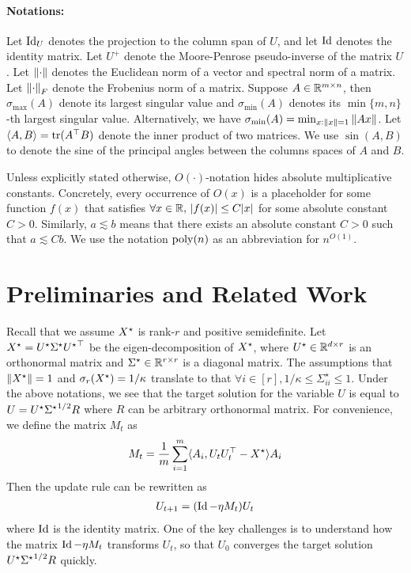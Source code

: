 \paragraph{Notations:}
Let $\operatorname{Id}_U$ denotes the projection to the column span of $U$, and let $\operatorname{Id}$ denotes the identity matrix.  Let $U^+$ denote the Moore-Penrose pseudo-inverse of the matrix $U$. Let $\left\|\cdot\right\|$ denotes the Euclidean norm of a vector and spectral norm of a matrix.  Let $\left\|\cdot\right\|_F$ denote the Frobenius norm of a matrix. 
Suppose $A\in \mathbb{R}^{m\times n}$, then $\sigma_{\max}(A)$ denote its largest singular value and $\sigma_{\min}(A)$ denotes its $\min\{m,n\}$-th largest singular value. Alternatively, we have $\sigma_{\min}(A) = \min_{x:\|x\|=1}\left\|Ax\right\|$. Let $\langle A, B \rangle = \textup{tr}(A^\top B)$ denote the inner product of two matrices. We use $\sin(A,B)$ to denote the sine of the principal angles between the columns spaces of $A$ and $B$. 

Unless explicitly stated otherwise, $O(\cdot)$-notation hides absolute multiplicative constants.
Concretely, every occurrence of $O(x)$ is a placeholder for some function $f(x)$ that satisfies $\forall x\in \mathbb{R},\, |{f(x)}|\le C|x|$ for some absolute constant $C>0$. Similarly, $a\lesssim b$ means that there exists an absolute constant $C> 0$ such that $a \lesssim Cb$. We use the notation $\textup{poly}(n)$ as an abbreviation for $n^{O(1)}$.  

\section{Preliminaries and Related Work}\label{sec:prelim}
Recall that we assume ${X}^\star$ is rank-$r$ and positive semidefinite. Let ${X}^\star = {{U}^\star} {{\Sigma}^\star}{{U}^\star}^{\top}$ be the eigen-decomposition of ${X}^\star$, where ${{U}^\star} \in \mathbb{R}^{d \times r}$ is an orthonormal matrix and ${{\Sigma}^\star} \in \mathbb{R}^{r \times r}$ is a diagonal matrix. The assumptions that $\|{X}^\star\| =1$ and $\sigma_{r}({X}^\star) = 1/\kappa$ translate to that $\forall i \in [r],  1/\kappa \le \Sigma^\star_{ii}\le 1$. 
Under the above notations, we see that the target solution for the variable $U$ is equal to $U = {{U}^\star} {\Sigma^\star}^{1/2}R$ where $R$ can be arbitrary orthonormal matrix. 
For convenience, we define the matrix $M_t$ as
\begin{align}
M_t = \frac{1}{m}\sum_{i = 1}^m\langle {A}_i, {U}_t{U}_t^\top - {X}^\star \rangle{A}_i \label{eqn:Mt}
\end{align}
\noindent Then the update rule can be rewritten as 
\begin{align}
U_{t+1} = (\operatorname{Id}- \eta M_t)U_t\label{eqn:def-Ut}
\end{align}
\noindent where $\operatorname{Id}$ is the identity matrix. One of the key challenges is to understand how the matrix $\operatorname{Id} - \eta M_t$ transforms $U_t$, so that $U_0$ converges the target solution ${{U}^\star} {\Sigma^\star}^{1/2}R$ quickly.

